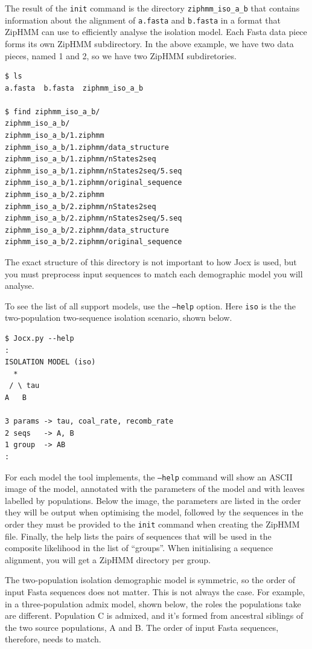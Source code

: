 \documentclass[graybox]{svmult}
\begin{document}
The result of the \texttt{init} command is the directory \texttt{ziphmm\_iso\_a\_b} that contains information about the alignment of \texttt{a.fasta} and \texttt{b.fasta} in a format that ZipHMM can use to efficiently analyse the isolation model.  Each Fasta data piece forms its own ZipHMM subdirectory.  In the above example, we have two data pieces, named 1 and 2, so we have two ZipHMM subdiretories.

 {\scriptsize{}\begin{verbatim}
$ ls
a.fasta  b.fasta  ziphmm_iso_a_b

$ find ziphmm_iso_a_b/
ziphmm_iso_a_b/
ziphmm_iso_a_b/1.ziphmm
ziphmm_iso_a_b/1.ziphmm/data_structure
ziphmm_iso_a_b/1.ziphmm/nStates2seq
ziphmm_iso_a_b/1.ziphmm/nStates2seq/5.seq
ziphmm_iso_a_b/1.ziphmm/original_sequence
ziphmm_iso_a_b/2.ziphmm
ziphmm_iso_a_b/2.ziphmm/nStates2seq
ziphmm_iso_a_b/2.ziphmm/nStates2seq/5.seq
ziphmm_iso_a_b/2.ziphmm/data_structure
ziphmm_iso_a_b/2.ziphmm/original_sequence
\end{verbatim}}

The exact structure of this directory is not important to how Jocx is used, but you must preprocess input sequences to match each demographic model you will analyse.

To see the list of all support models, use the \texttt{--help} option. Here \texttt{iso} is the the two-population two-sequence isolation scenario, shown below.

 {\scriptsize{}\begin{verbatim}
$ Jocx.py --help
:
ISOLATION MODEL (iso)
  *
 / \ tau
A   B

3 params -> tau, coal_rate, recomb_rate
2 seqs   -> A, B
1 group  -> AB
:
\end{verbatim}}

For each model the tool implements, the \texttt{--help} command will show an ASCII image of the model, annotated with the parameters of the model and with leaves labelled by populations. Below the image, the parameters are listed in the order they will be output when optimising the model, followed by the sequences in the order they must be provided to the \texttt{init} command when creating the ZipHMM file. Finally, the help lists the pairs of sequences that will be used in the composite likelihood in the list of ``groups''. When initialising a sequence alignment, you will get a ZipHMM directory per group.

The two-population isolation demographic model is symmetric, so the order of input Fasta sequences does not matter. This is not always the case. For example, in a three-population admix model, shown below, the roles the populations take are different. Population C is admixed, and it's formed from ancestral siblings of the two source populations, A and B. The order of input Fasta sequences, therefore, needs to match.
\end{document}
